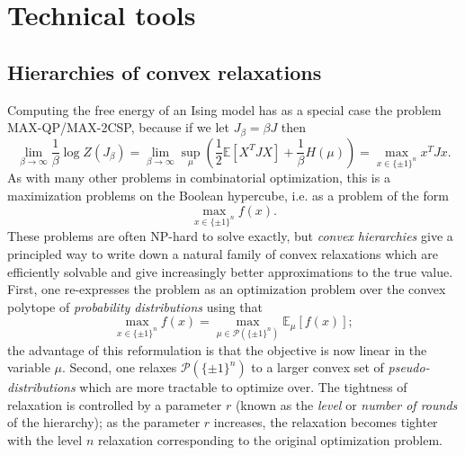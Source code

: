 \documentclass[11pt, oneside, english]{article}
\newcommand{\bE}{\mathbb{E}}
\newcommand{\E}{\bE}      %
\theoremstyle{definition}
\theoremstyle{plain}
\begin{document}
\section{Technical tools}
\subsection{Hierarchies of convex relaxations} %
Computing the free energy of an Ising model has as a special case the problem
MAX-QP/MAX-2CSP, because if we let $J_{\beta} = \beta J$ then
\begin{equation}
\lim_{\beta \to \infty} \frac{1}{\beta} \log Z(J_{\beta}) = \lim_{\beta \to \infty} \sup_{\mu} \left(\frac{1}{2} \E[X^T J X]+ \frac{1}{\beta} H(\mu)\right) = \max_{x \in \{\pm 1\}^n} x^T J x.
\end{equation}
As with many other problems in combinatorial optimization, this is a  maximization problems on the Boolean hypercube, i.e. as a problem of the form
\[ \max_{x \in \{\pm 1\}^n} f(x). \]
These problems are often NP-hard to solve exactly, but \emph{convex hierarchies} give a principled way to write down a natural family of convex relaxations which are efficiently solvable and give increasingly better approximations to the true value.
First, one re-expresses the problem as an optimization problem over the convex polytope of \emph{probability distributions} using that
\[ \max_{x \in \{\pm 1\}^n} f(x) = \max_{\mu \in \mathcal{P}(\{ \pm 1\}^n)} \E_{\mu}[f(x)]; \]
the advantage of this reformulation is that the objective is now linear in the variable $\mu$. Second, one relaxes $\mathcal{P}(\{ \pm 1\}^n)$ to a larger convex set of \emph{pseudo-distributions} which are more tractable to optimize over. The tightness of relaxation is controlled by a parameter $r$ (known as the \emph{level} or \emph{number of rounds} of the hierarchy); as the parameter $r$ increases, the relaxation becomes tighter with the level $n$ relaxation corresponding to the original optimization problem. 
\end{document}
